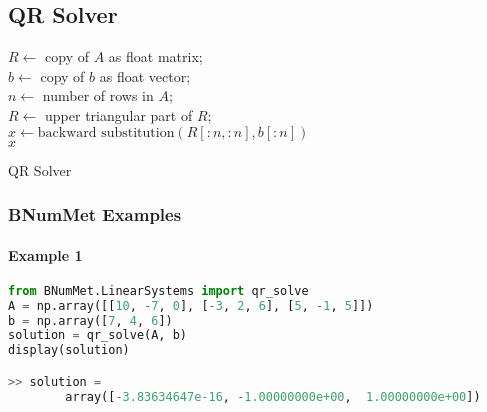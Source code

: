 \subsection{QR Solver}
\begin{algorithm}[H]
\SetAlgoLined
\DontPrintSemicolon
{}
$R \gets$ copy of $A$ as float matrix;\\
$b \gets$ copy of $b$ as float vector;\\
$n \gets$ number of rows in $A$;\\
$R \gets$ upper triangular part of $R$;\\
$x \gets \text{backward substitution}(R[:n,:n], b[:n])$\\
\Return $x$
\caption{QR Solver}
\end{algorithm}
\subsubsection{BNumMet Examples}
\paragraph{Example 1}{
\begin{lstlisting}[language=Python]
from BNumMet.LinearSystems import qr_solve
A = np.array([[10, -7, 0], [-3, 2, 6], [5, -1, 5]])
b = np.array([7, 4, 6])
solution = qr_solve(A, b)
display(solution)

>> solution = 
        array([-3.83634647e-16, -1.00000000e+00,  1.00000000e+00])
\end{lstlisting}
}